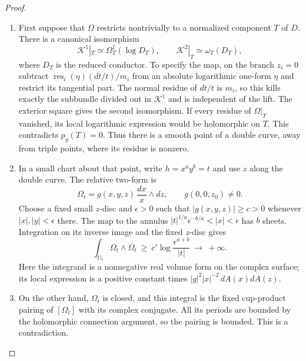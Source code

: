 \begin{proof}
\begin{enumerate}[label={$\langle1\rangle$\arabic*.},leftmargin=*]
\item First suppose that $\Omega$ restricts nontrivially to a normalized
component $T$ of $D$. There is a canonical isomorphism
\[
 \mathscr K^1|_T\simeq\Omega_T^1(\log D_T),\qquad
 \mathscr K^2|_T\simeq\omega_T(D_T),
\]
where $D_T$ is the reduced conductor. To specify the map, on the
branch $z_i=0$ subtract
$\operatorname{res}_i(\eta)(dt/t)/m_i$ from an absolute logarithmic
one-form $\eta$ and restrict its tangential part. The normal
residue of $dt/t$ is $m_i$, so this kills exactly the subbundle
divided out in $\mathscr K^1$ and is independent of the lift.
The exterior square gives the second isomorphism. If every
residue of $\Omega|_T$ vanished, its local logarithmic expression
would be holomorphic on $T$. This contradicts $p_g(T)=0$.
Thus there is a smooth point of a double curve, away from triple
points, where its residue is nonzero.

\item In a small chart about that point, write $h=x^ay^b=t$ and use $z$
along the double curve. The relative two-form is
\[
 \Omega_t=g(x,y,z)\,\frac{dx}{x}\wedge dz,
 \qquad g(0,0,z_0)\ne0.
\]
Choose a fixed small $z$-disc and $\epsilon>0$ such that
$|g(x,y,z)|\ge c>0$ whenever $|x|,|y|<\epsilon$ there.
The map to the annulus
$|t|^{1/a}\epsilon^{-b/a}<|x|<\epsilon$
has $b$ sheets. Integration on its inverse image and the fixed
$z$-disc gives
\[
 \int_{U_t}\Omega_t\wedge\overline{\Omega_t}
 \ \ge\ c'\log\frac{\epsilon^{a+b}}{|t|}
 \ \longrightarrow\ +\infty.
\]
Here the integrand is a nonnegative real volume form on the
complex surface; its local expression is a positive constant
times $|g|^2|x|^{-2}\,dA(x)dA(z)$.

\item On the other hand, $\Omega_t$ is closed, and this integral is
the fixed cup-product pairing of $[\Omega_t]$ with its complex
conjugate. All its periods are bounded by the holomorphic
connection argument, so the pairing is bounded. This is a
contradiction.


\end{enumerate}
\end{proof}
